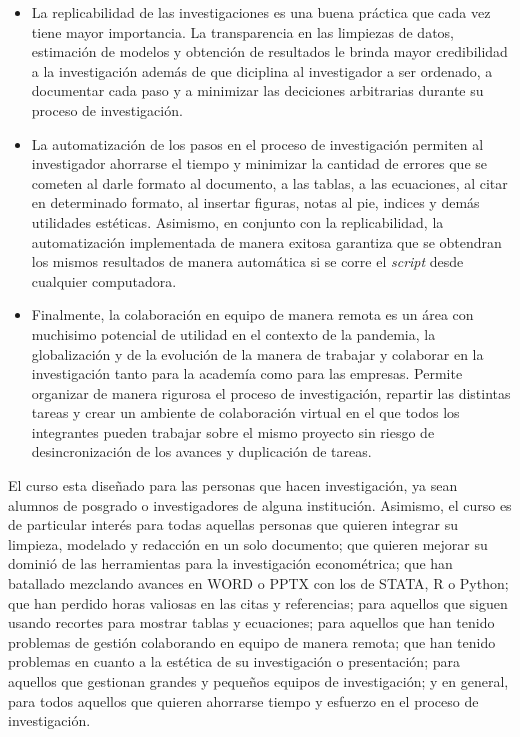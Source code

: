 \documentclass[11pt,]{article}
\begin{document}
\begin{itemize}
\item
  La replicabilidad de las investigaciones es una buena práctica que
  cada vez tiene mayor importancia. La transparencia en las limpiezas de
  datos, estimación de modelos y obtención de resultados le brinda mayor
  credibilidad a la investigación además de que diciplina al
  investigador a ser ordenado, a documentar cada paso y a minimizar las
  deciciones arbitrarias durante su proceso de investigación.
\item
  La automatización de los pasos en el proceso de investigación permiten
  al investigador ahorrarse el tiempo y minimizar la cantidad de errores
  que se cometen al darle formato al documento, a las tablas, a las
  ecuaciones, al citar en determinado formato, al insertar figuras,
  notas al pie, indices y demás utilidades estéticas. Asimismo, en
  conjunto con la replicabilidad, la automatización implementada de
  manera exitosa garantiza que se obtendran los mismos resultados de
  manera automática si se corre el \emph{script} desde cualquier
  computadora.
\item
  Finalmente, la colaboración en equipo de manera remota es un área con
  muchisimo potencial de utilidad en el contexto de la pandemia, la
  globalización y de la evolución de la manera de trabajar y colaborar
  en la investigación tanto para la academía como para las empresas.
  Permite organizar de manera rigurosa el proceso de investigación,
  repartir las distintas tareas y crear un ambiente de colaboración
  virtual en el que todos los integrantes pueden trabajar sobre el mismo
  proyecto sin riesgo de desincronización de los avances y duplicación
  de tareas.
\end{itemize}

El curso esta diseñado para las personas que hacen investigación, ya
sean alumnos de posgrado o investigadores de alguna institución.
Asimismo, el curso es de particular interés para todas aquellas personas
que quieren integrar su limpieza, modelado y redacción en un solo
documento; que quieren mejorar su dominió de las herramientas para la
investigación econométrica; que han batallado mezclando avances en WORD
o PPTX con los de STATA, R o Python; que han perdido horas valiosas en
las citas y referencias; para aquellos que siguen usando recortes para
mostrar tablas y ecuaciones; para aquellos que han tenido problemas de
gestión colaborando en equipo de manera remota; que han tenido problemas
en cuanto a la estética de su investigación o presentación; para
aquellos que gestionan grandes y pequeños equipos de investigación; y en
general, para todos aquellos que quieren ahorrarse tiempo y esfuerzo en
el proceso de investigación.
\end{document}
